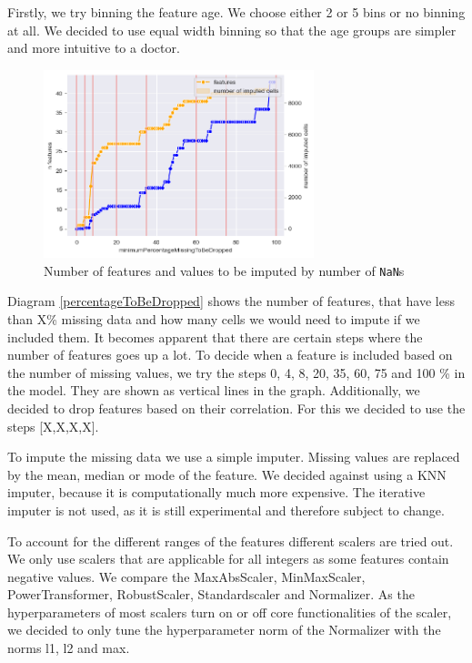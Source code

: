 Firstly, we try binning the feature age. We choose either 2 or 5 bins or no binning at all. We decided to use equal width binning so that the age groups are simpler and more intuitive to a doctor.

\begin{figure}[h]
	\centering
	\includegraphics[width=0.7\textwidth]{images/percentageToBeDropped.png}
	\caption{Number of features and values to be imputed by number of \texttt{NaN}s}
	\label{fig:percentageToBeDropped}
\end{figure}
Diagram \ref{percentageToBeDropped} shows the number of features, that have less than X\% missing data and how many cells we would need to impute if we included them. It becomes apparent that there are certain steps where the number of features goes up a lot. To decide when a feature is included based on the number of missing values, we try the steps 0, 4, 8, 20, 35, 60, 75 and 100 \% in the model. They are shown as vertical lines in the graph. Additionally, we decided to drop features based on their correlation. For this we decided to use the steps [X,X,X,X].

To impute the missing data we use a simple imputer. Missing values are replaced by the mean, median or mode of the feature. We decided against using a KNN imputer, because it is computationally much more expensive. The iterative imputer is not used, as it is still experimental and therefore subject to change.

To account for the different ranges of the features different scalers are tried out. We only use scalers that are applicable for all integers as some features contain negative values. 
We compare the MaxAbsScaler, MinMaxScaler, PowerTransformer, RobustScaler, Standardscaler and Normalizer. As the hyperparameters of most scalers turn on or off core functionalities of the scaler, we decided to only tune the hyperparameter norm of the Normalizer with the norms l1, l2 and max.

